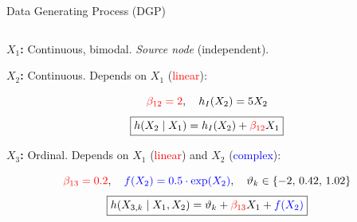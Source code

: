 \documentclass[onlytextwidth,english]{beamer}\usepackage[]{graphicx}\usepackage[]{xcolor}
\begin{document}
\begin{frame}{Data Generating Process (DGP)}

\begin{columns}

\begin{column}{0.72\textwidth}

\textbf{\(X_1\):} Continuous, bimodal. \textit{Source node} (independent).

\vspace{0.4cm}

\textbf{\(X_2\):} Continuous. Depends on \(X_1\) (\textcolor{red}{linear}):

\vspace{0.15cm}
{\scriptsize
\[
\textcolor{red}{\beta_{12} = 2}, \quad h_I(X_2) = 5 X_2
\]
\[
\boxed{
h(X_2 \mid X_1) = h_I(X_2) + \textcolor{red}{\beta_{12}} X_1
}
\]
}

\vspace{0.4cm}

\textbf{\(X_3\):} Ordinal. Depends on \(X_1\) (\textcolor{red}{linear}) and \(X_2\) (\textcolor{blue}{complex}):

\vspace{0.15cm}
{\scriptsize
\[
\textcolor{red}{\beta_{13} = 0.2}, \quad \textcolor{blue}{f(X_2) = 0.5 \cdot \exp(X_2)}, \quad \vartheta_k \in \{-2,\, 0.42,\, 1.02\}
\]
\[
\boxed{
h(X_{3,k} \mid X_1, X_2) = \vartheta_k + \textcolor{red}{\beta_{13}} X_1 + \textcolor{blue}{f(X_2)}
}
\]
}


\end{column}


\end{columns}
\end{frame}
\end{document}
